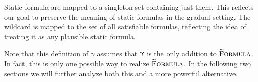 Static formula are mapped to a singleton set containing just them.
This reflects our goal to preserve the meaning of static formulas in the gradual setting.
The wildcard is mapped to the set of all satisfiable formulas, reflecting the idea of treating it as any plausible static formula.

Note that this definition of $\gamma$ assumes that $\textup{\texttt{?}}$ is the only addition to $\textup{\textsc{\ensuremath{\widetilde{\text{F}}}ormula}}$.
In fact, this is only one possible way to realize $\textup{\textsc{\ensuremath{\widetilde{\text{F}}}ormula}}$.
In the following two sections we will further analyze both this and a more powerful alternative.